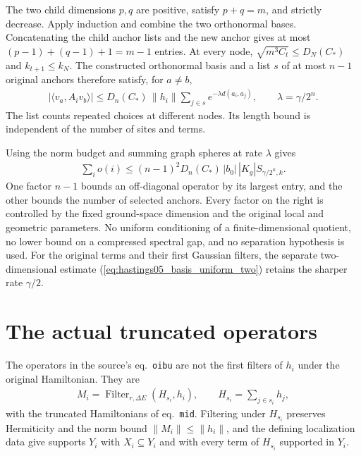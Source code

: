 \documentclass{article}
\begin{document}
The two child dimensions $p,q$ are positive, satisfy $p+q=m$, and strictly
decrease. Apply induction and combine the two orthonormal bases. Concatenating
the child anchor lists and the new anchor gives at most
$(p-1)+(q-1)+1=m-1$ entries. At every node,
$\sqrt{m^3C_t}\le D_N(C_*)$ and $k_{t+1}\le k_N$.
The constructed orthonormal basis and a list $s$ of at most $n-1$ original
anchors therefore satisfy, for $a\ne b$,
\begin{align}
 |\langle v_a,A_iv_b\rangle|
 \le D_n(C_*)\,\|h_i\|\sum_{j\in s}e^{-\lambda d(a_i,a_j)},
 \qquad \lambda=\gamma/2^n.
 \label{eq:hastings05_basis_recursive_entries}
\end{align}
The list counts repeated choices at different nodes. Its length bound is
independent of the number of sites and terms.

Using the norm budget and summing graph spheres at rate $\lambda$ gives
\begin{align}
 \sum_i o(i)\le(n-1)^2D_n(C_*)\,|b_0|\,|K_g|S_{\gamma/2^n,k}.
 \label{eq:hastings05_basis_recursive_sum}
\end{align}
One factor $n-1$ bounds an off-diagonal operator by its largest entry, and the
other bounds the number of selected anchors. Every factor on the right is
controlled by the fixed ground-space dimension and the original local and
geometric parameters. No uniform conditioning of a finite-dimensional quotient,
no lower bound on a compressed spectral gap, and no separation hypothesis is
used. For the original terms and their first Gaussian filters, the separate
two-dimensional estimate (\ref{eq:hastings05_basis_uniform_two}) retains the
sharper rate $\gamma/2$.

\section{The actual truncated operators}

The operators in the source's eq.~\texttt{oibu} are not the first filters of
$h_i$ under the original Hamiltonian. They are
\begin{align}
 M_i=\operatorname{Filter}_{r,\Delta E}(H_{s_i},h_i),
 \qquad H_{s_i}=\sum_{j\in s_i}h_j,
 \label{eq:hastings05_basis_truncated_terms}
\end{align}
with the truncated Hamiltonians of eq.~\texttt{mid}. Filtering under $H_{s_i}$
preserves Hermiticity and the norm bound $\|M_i\|\le\|h_i\|$, and the defining
localization data give supports $Y_i$ with $X_i\subseteq Y_i$ and with every
term of $H_{s_i}$ supported in $Y_i$.
\end{document}
